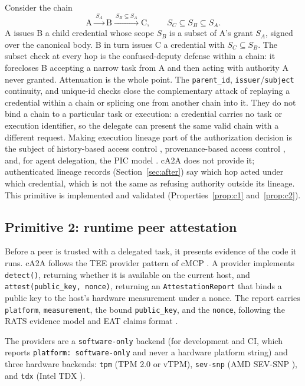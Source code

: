 Consider the chain
\[
  \text{A} \xrightarrow{\ S_A\ } \text{B} \xrightarrow{\ S_B \subseteq S_A\ } \text{C},
  \qquad S_C \subseteq S_B \subseteq S_A .
\]
A issues B a child credential whose scope $S_B$ is a subset of A's grant $S_A$, signed over
the canonical body. B in turn issues C a credential with $S_C \subseteq S_B$. The subset
check at every hop is the confused-deputy defense within a chain: it forecloses B accepting a narrow task
from A and then acting with authority A never granted. Attenuation is the whole point.
The \texttt{parent\_id}, \texttt{issuer}/\texttt{subject} continuity, and unique-id checks
close the complementary attack of replaying a credential within a chain or splicing one from
another chain into it. They do not bind a chain to a particular task or execution: a credential
carries no task or execution identifier, so the delegate can present the same valid chain
with a different request. Making execution lineage part of the authorization decision is the
subject of history-based access control \citep{abadi2003history}, provenance-based access control
\citep{park2012pbac}, and, for agent delegation, the PIC model \citep{gallo2026pic}. cA2A does not
provide it; authenticated lineage records (Section~\ref{sec:after}) say which hop acted under
which credential, which is not the same as refusing authority outside its lineage. This primitive is implemented and validated (Properties~\ref{prop:c1}
and~\ref{prop:c2}).

\subsection{Primitive 2: runtime peer attestation}\label{subsec:attestation}

Before a peer is trusted with a delegated task, it presents evidence of the code it runs. cA2A
follows the TEE provider pattern of cMCP \citep{cmcp2026}. A provider
implements \texttt{detect()}, returning whether it is available on the current host, and
\texttt{attest(public\_key, nonce)}, returning an \texttt{AttestationReport} that binds a
public key to the host's hardware measurement under a nonce. The report carries
\texttt{platform}, \texttt{measurement}, the bound \texttt{public\_key}, and the \texttt{nonce},
following the RATS evidence model \citep{rats2021} and EAT claims format \citep{eat2023}.

The providers are a \texttt{software-only} backend (for development and CI, which reports
\texttt{platform:\ software-only} and never a hardware platform string) and three hardware
backends: \texttt{tpm} (TPM 2.0 or vTPM), \texttt{sev-snp} (AMD SEV-SNP \citep{amdsevsnp2023}),
and \texttt{tdx} (Intel TDX \citep{inteltdx2023}).

